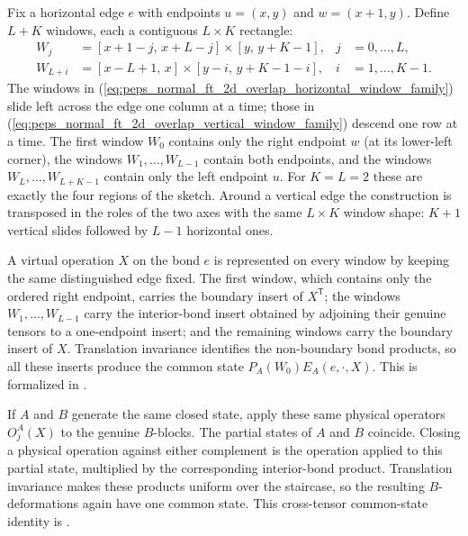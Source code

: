 \documentclass{article}
\begin{document}
Fix a horizontal edge $e$ with endpoints $u = (x,y)$ and $w = (x+1,y)$.
Define $L+K$ windows, each a contiguous $L \times K$ rectangle:
\begin{align}
    W_j
     & = [x+1-j,\, x+L-j] \times [y,\, y+K-1],
     & j                                       & = 0, \dots, L,
    \label{eq:peps_normal_ft_2d_overlap_horizontal_window_family} \\
    W_{L+i}
     & = [x-L+1,\, x] \times [y-i,\, y+K-1-i],
     & i                                       & = 1, \dots, K-1.
    \label{eq:peps_normal_ft_2d_overlap_vertical_window_family}
\end{align}
The windows in (\ref{eq:peps_normal_ft_2d_overlap_horizontal_window_family})
slide left across the edge one column at a time; those in
(\ref{eq:peps_normal_ft_2d_overlap_vertical_window_family}) descend one row
at a time. The first window $W_0$
contains only the right endpoint $w$ (at its lower-left corner), the
windows $W_1, \dots, W_{L-1}$ contain both endpoints, and the windows
$W_L, \dots, W_{L+K-1}$ contain only the left endpoint $u$. For
$K = L = 2$ these are exactly the four regions of the sketch. Around a
vertical edge the construction is transposed in the roles of the two
axes with the same $L \times K$ window shape: $K+1$ vertical slides
followed by $L-1$ horizontal ones.

A virtual operation $X$ on the bond $e$ is represented on every window by
keeping the same distinguished edge fixed.  The first window, which contains
only the ordered right endpoint, carries the boundary insert of
$X^{\mathsf T}$; the windows $W_1,\dots,W_{L-1}$ carry the interior-bond
insert obtained by adjoining their genuine tensors to a one-endpoint insert;
and the remaining windows carry the boundary insert of $X$.  Translation
invariance identifies the non-boundary bond products, so all these inserts
produce the common state $P_A(W_0)E_A(e,\cdot,X)$.  This is formalized in
.

If $A$ and $B$ generate the same closed state, apply these same physical
operators $O_j^A(X)$ to the genuine $B$-blocks.  The partial states of $A$ and
$B$ coincide.  Closing a physical operation against either complement is the
operation applied to this partial state, multiplied by the corresponding
interior-bond product.  Translation invariance makes these products uniform
over the staircase, so the resulting $B$-deformations again have one common
state.  This cross-tensor common-state identity is
.
\end{document}
